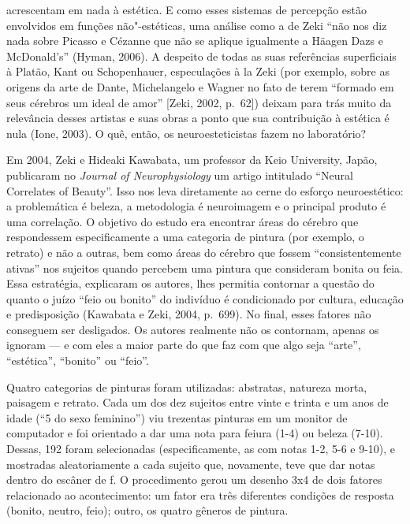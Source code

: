 acrescentam em nada à estética. E como esses sistemas de percepção estão
envolvidos em funções não"-estéticas, uma análise como a de Zeki ``não
nos diz nada sobre Picasso e Cézanne que não se aplique igualmente a
Häagen Dazs e McDonald's'' (Hyman, 2006). A despeito de todas as suas
referências superficiais à Platão, Kant ou Schopenhauer, especulações à
la Zeki (por exemplo, sobre as origens da arte de Dante, Michelangelo e
Wagner no fato de terem ``formado em seus cérebros um ideal de amor''
{[}Zeki, 2002, p.~62{]}) deixam para trás muito da relevância desses
artistas e suas obras a ponto que sua contribuição à estética é nula
(Ione, 2003). O quê, então, os neuroesteticistas fazem no laboratório?

Em 2004, Zeki e Hideaki Kawabata, um professor da Keio University,
Japão, publicaram no \emph{Journal of Neurophysiology} um artigo
intitulado ``Neural Correlates of Beauty''. Isso nos leva diretamente ao
cerne do esforço neuroestético: a problemática é beleza, a metodologia é
neuroimagem e o principal produto é uma correlação. O objetivo do estudo
era encontrar áreas do cérebro que respondessem especificamente a uma
categoria de pintura (por exemplo, o retrato) e não a outras, bem como
áreas do cérebro que fossem ``consistentemente ativas'' nos sujeitos
quando percebem uma pintura que consideram bonita ou feia. Essa
estratégia, explicaram os autores, lhes permitia contornar a questão do
quanto o juízo ``feio ou bonito'' do indivíduo é condicionado por
cultura, educação e predisposição (Kawabata e Zeki, 2004, p.~699). No
final, esses fatores não conseguem ser desligados. Os autores realmente
não os contornam, apenas os ignoram --- e com eles a maior parte do que
faz com que algo seja ``arte'', ``estética'', ``bonito'' ou ``feio''.

Quatro categorias de pinturas foram utilizadas: abstratas, natureza
morta, paisagem e retrato. Cada um dos dez sujeitos entre vinte e trinta
e um anos de idade (``5 do sexo feminino'') viu trezentas pinturas em um
monitor de computador e foi orientado a dar uma nota para feiura (1-4)
ou beleza (7-10). Dessas, 192 foram selecionadas (especificamente, as
com notas 1-2, 5-6 e 9-10), e mostradas aleatoriamente a cada sujeito
que, novamente, teve que dar notas dentro do escâner de f. O
procedimento gerou um desenho 3x4 de dois fatores relacionado ao
acontecimento: um fator era três diferentes condições de resposta
(bonito, neutro, feio); outro, os quatro gêneros de pintura.

